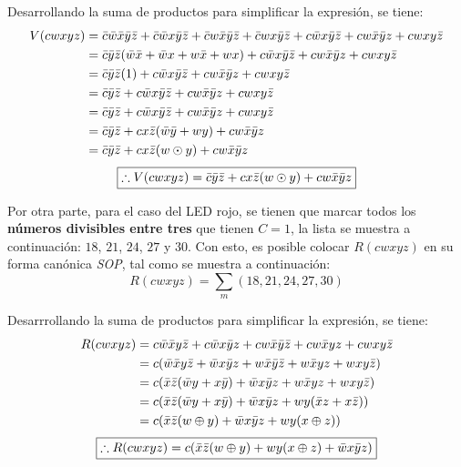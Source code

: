 \documentclass[../procedimientos.tex]{subfiles}
\begin{document}
Desarrollando la suma de productos para simplificar la expresión, se tiene:
\begin{align*}
  V(cwxyz) &= \bar{c}\bar{w}\bar{x}\bar{y}\bar{z} + \bar{c}\bar{w}x\bar{y}\bar{z} + 
  \bar{c}w\bar{x}\bar{y}\bar{z} + \bar{c}wx\bar{y}\bar{z} + c\bar{w}x\bar{y}\bar{z} + 
  cw\bar{x}\bar{y}z + cwxy\bar{z}\\
  &= \bar{c}\bar{y}\bar{z} (\bar{w}\bar{x} + \bar{w}x + w\bar{x} + wx) + 
  c\bar{w}x\bar{y}\bar{z} + cw\bar{x}\bar{y}z + cwxy\bar{z}\\
  &= \bar{c}\bar{y}\bar{z} (1) + c\bar{w}x\bar{y}\bar{z} + cw\bar{x}\bar{y}z + 
  cwxy\bar{z}\\
  &= \bar{c}\bar{y}\bar{z} + c\bar{w}x\bar{y}\bar{z} + cw\bar{x}\bar{y}z + 
  cwxy\bar{z}\\
  &= \bar{c}\bar{y}\bar{z} + c\bar{w}x\bar{y}\bar{z} + cw\bar{x}\bar{y}z + 
  cwxy\bar{z}\\
  &= \bar{c}\bar{y}\bar{z} + cx\bar{z} (\bar{w}\bar{y} + wy) + cw\bar{x}\bar{y}z\\
  &= \bar{c}\bar{y}\bar{z} + cx\bar{z} (w \odot y) + cw\bar{x}\bar{y}z
\end{align*}
\begin{equation*}
  \boxed{
    \therefore V(cwxyz) = \bar{c}\bar{y}\bar{z} + cx\bar{z} (w \odot y) + 
  cw\bar{x}\bar{y}z
  }
\end{equation*}

Por otra parte, para el caso del LED rojo, se tienen que marcar todos los 
\textbf{números divisibles entre tres} que tienen $C=1$, la lista se muestra a 
continuación: $18$, $21$, $24$, $27$ y $30$. Con esto, es posible colocar 
$R(cwxyz)$ en su forma canónica \textit{SOP}, tal como se muestra a 
continuación:
\begin{equation*}
  R(cwxyz) = \sum_m (18, 21, 24, 27, 30)
\end{equation*}

Desarrrollando la suma de productos para simplificar la expresión, se tiene:
\begin{align*}
  R(cwxyz) &= c\bar{w}\bar{x}y\bar{z} + c\bar{w}x\bar{y}z + cw\bar{x}\bar{y}\bar{z} + 
  cw\bar{x}yz + cwxy\bar{z}\\
  &= c(\bar{w}\bar{x}y\bar{z} + \bar{w}x\bar{y}z + w\bar{x}\bar{y}\bar{z} + w\bar{x}yz 
  + wxy\bar{z})\\
  &= c(\bar{x}\bar{z}(\bar{w}y + x\bar{y}) + \bar{w}x\bar{y}z + w\bar{x}yz + 
  wxy\bar{z})\\
  &= c(\bar{x}\bar{z}(\bar{w}y + x\bar{y}) + \bar{w}x\bar{y}z + wy(\bar{x}z + 
  x\bar{z}))\\
  &= c(\bar{x}\bar{z}(w \oplus y) + \bar{w}x\bar{y}z + wy(x \oplus z))
\end{align*}
\begin{equation*}
  \boxed{
    \therefore R(cwxyz) = c(\bar{x}\bar{z}(w \oplus y) + wy(x \oplus z) + 
    \bar{w}x\bar{y}z)
  }
\end{equation*}
\end{document}
